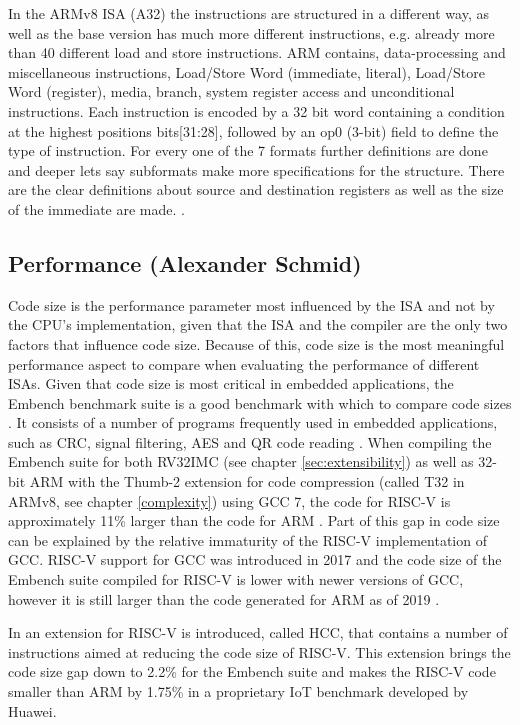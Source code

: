 \documentclass[conference]{IEEEtran}
\begin{document}
	In the ARMv8 \gls{ISA} (A32) the instructions are structured in a different way, as well as the base version has much more different instructions, e.g. already more than 40 different load and store instructions. ARM contains, data-processing and miscellaneous instructions, Load/Store Word (immediate, literal), Load/Store Word (register), media, branch, system register access and unconditional instructions.	Each instruction is encoded by a 32 bit word containing a condition at the highest positions bits[31:28], followed by an op0 (3-bit) field to define the type of instruction. For every one of the 7 formats further definitions are done and deeper lets say subformats make more specifications for the structure. There are the clear definitions about source and destination registers as well as the size of the immediate are made. \cite[page 4218 - 4278]{Arm2020}.
	
	\subsection{Performance (Alexander Schmid)}
	\label{performance}
	Code size is the performance parameter most influenced by the \gls{ISA} and not by the \gls{CPU}'s implementation,
	given that the \gls{ISA} and the compiler are the only two factors that influence code size.
	Because of this, code size is the most meaningful performance aspect to compare when evaluating the performance of different \glspl{ISA}.
	Given that code size is most critical in embedded applications, the Embench benchmark suite is a good benchmark
	with which to compare code sizes \cite{Patterson2019}. It consists of a number of programs frequently used in embedded
	applications, such as CRC, signal filtering, AES and QR code reading \cite{Patterson2019}.
	When compiling the Embench suite for both RV32IMC (see chapter \ref{sec:extensibility}) as well as 32-bit ARM with the Thumb-2 extension for code compression (called T32 in ARMv8, see chapter \ref{complexity}) using GCC 7,
	the code for RISC-V is approximately 11\% larger than the code for ARM \cite{Perotti2020}.
	Part of this gap in code size can be explained by the relative immaturity of the RISC-V implementation of
	GCC. RISC-V support for GCC was introduced in 2017 and the code size of the Embench suite
	compiled for RISC-V is lower with newer versions of GCC, however it is still larger than the code generated for ARM as of 2019 \cite{Patterson2019}.

	In \cite{Perotti2020} an extension for RISC-V is introduced, called HCC, that contains a number of instructions
	aimed at reducing the code size of RISC-V. This extension brings the code size gap down to 2.2\% for the Embench suite
	and makes the RISC-V code smaller than ARM by 1.75\% in a proprietary IoT benchmark developed by Huawei. \cite{Perotti2020}
	
\end{document}
